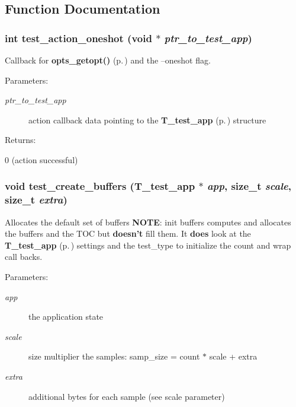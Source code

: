 \subsection{Function Documentation}
\subsubsection{\setlength{\rightskip}{0pt plus 5cm}int test\_\-action\_\-oneshot (void $\ast$ {\em ptr\_\-to\_\-test\_\-app})}\label{group__test_a2}


Callback for {\bf opts\_\-getopt()} {\rm (p.\,\pageref{group__opts_a3})} and the --oneshot flag.

\begin{Desc}
\item[Parameters: ]\par
\begin{description}
\item[{\em 
ptr\_\-to\_\-test\_\-app}]action callback data pointing to the {\bf T\_\-test\_\-app} {\rm (p.\,\pageref{structT__test__app})} structure \end{description}
\end{Desc}
\begin{Desc}
\item[Returns: ]\par
0 (action successful) \end{Desc}
\subsubsection{\setlength{\rightskip}{0pt plus 5cm}void test\_\-create\_\-buffers ({\bf T\_\-test\_\-app} $\ast$ {\em app}, size\_\-t {\em scale}, size\_\-t {\em extra})}\label{group__test_a1}


Allocates the default set of buffers {\bf NOTE}: init buffers computes and allocates the buffers and the TOC but {\bf doesn't} fill them. It {\bf does} look at the {\bf T\_\-test\_\-app} {\rm (p.\,\pageref{structT__test__app})} settings and the test\_\-type to initialize the count and wrap call backs.

\begin{Desc}
\item[Parameters: ]\par
\begin{description}
\item[{\em 
app}]the application state \item[{\em 
scale}]size multiplier the samples: samp\_\-size = count $\ast$ scale + extra \item[{\em 
extra}]additional bytes for each sample (see scale parameter) \end{description}
\end{Desc}
